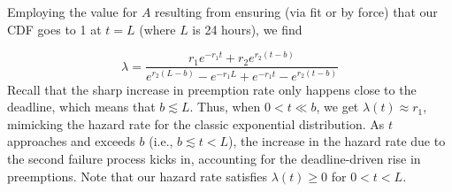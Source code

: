 Employing the value for $A$ resulting from ensuring (via fit or by force) that our CDF goes to 1 at $t = L$ (where $L$ is 24 hours), we find

\begin{equation}
  \label{eq:hmodel2}
  \lambda %
  = \dfrac{r_1 e^{- r_1 t} + r_2 e^{r_2 (t - b)}}{e^{r_2 (L - b)}  - e^{- r_1 L} + e^{- r_1 t} - e^{r_2 (t - b)} }
\end{equation}
Recall that the sharp increase in preemption rate only happens close to the deadline, which means that $b \lesssim L$. Thus, when $0 < t \ll b$, we get $\lambda(t) \approx r_1$, mimicking the hazard rate for the classic exponential distribution.
As $t$ approaches and exceeds $b$ (i.e., $b\lesssim t < L$), the increase in the hazard rate due to the second failure process kicks in, accounting for the deadline-driven rise in preemptions. Note that our hazard rate satisfies $\lambda(t) \ge 0$ for $0<t<L$.


% 





